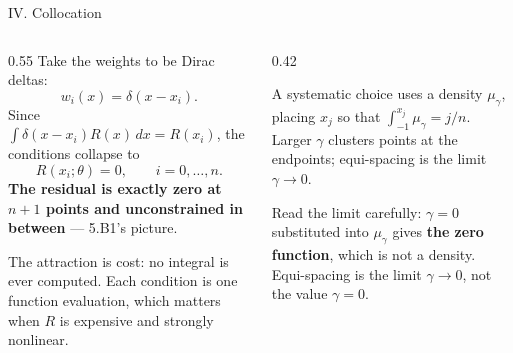 \begin{frame}{IV. Collocation}
\begin{columns}[T]
\begin{column}{0.55\textwidth}
\small
Take the weights to be Dirac deltas:
\[
  w_i(x)=\delta(x-x_i).
\]
Since $\int \delta(x-x_i)R(x)\,dx = R(x_i)$, the conditions collapse to
\[
  R(x_i;\theta)=0,\qquad i=0,\dots,n .
\]
\textbf{The residual is exactly zero at $n+1$ points and unconstrained in between} --- 5.B1's picture.
\medskip

The attraction is cost: no integral is ever computed. Each condition is one function evaluation, which matters when $R$ is expensive and strongly nonlinear.
\end{column}
\begin{column}{0.42\textwidth}
\begin{conceptbox}[title=\textbf{Picking the points}]\footnotesize
A systematic choice uses a density $\mu_\gamma$, placing $x_j$ so that $\int_{-1}^{x_j}\mu_\gamma=j/n$. Larger $\gamma$ clusters points at the endpoints; equi-spacing is the limit $\gamma\to0$.
\end{conceptbox}
\medskip
\begin{cautionbox}\footnotesize
Read the limit carefully: $\gamma=0$ substituted into $\mu_\gamma$ gives \textbf{the zero function}, which is not a density. Equi-spacing is the limit $\gamma\to0$, not the value $\gamma=0$.
\end{cautionbox}
\end{column}
\end{columns}
\vspace{1mm}
\end{frame}

